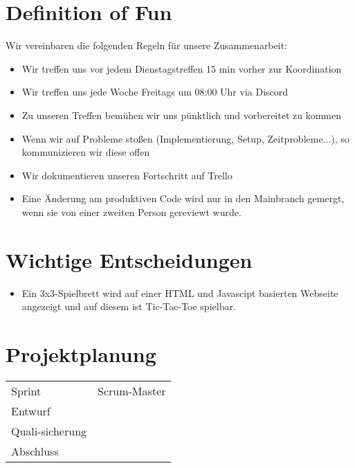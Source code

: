 \documentclass[titlepage]{scrartcl}
\begin{document}
\section{Definition of Fun}%
Wir vereinbaren die folgenden Regeln für unsere Zusammenarbeit:
\begin{itemize}
	\item Wir treffen uns vor jedem Dienstagstreffen 15 min vorher zur Koordination
	\item Wir treffen uns jede Woche Freitags um 08:00 Uhr via Discord
	\item Zu unseren Treffen bemühen wir uns pünktlich und vorbereitet zu kommen
	\item Wenn wir auf Probleme stoßen (Implementierung, Setup, Zeitprobleme...), so kommunizieren wir diese offen
	\item Wir dokumentieren unseren Fortschritt auf Trello
	\item Eine Änderung am produktiven Code wird nur in den Mainbranch gemergt, wenn sie von einer zweiten Person gereviewt wurde.
\end{itemize}

\section{Wichtige Entscheidungen}
\begin{itemize}
\item Ein 3x3-Spielbrett wird auf einer HTML und Javascipt basierten Webseite angezeigt und auf diesem ist Tic-Tac-Toe spielbar.
\end{itemize}
\section{Projektplanung}%
\begin{tabular}{lc}
	Sprint & Scrum-Master\\
	Entwurf & \\
	Quali-sicherung & \\
	Abschluss & \\
\end{tabular}
\end{document}
